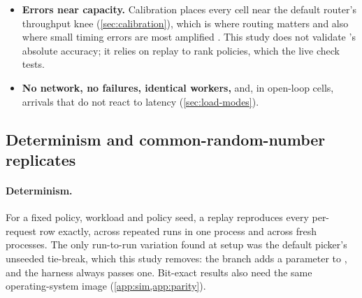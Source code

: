 \begin{itemize}
    prefill pass that mixes requests from the mean new and mean cached length of the batch, so
    adding a short prompt to a long-context chunk can shorten the predicted pass (from
    \SI{1744}{ms} to \SI{1150}{ms} in one probe). Its attention table for this configuration
    covers prompts up to 16,384 tokens with no cached prefix, so longer prefills are
    extrapolated. The likely effect is a small optimism when short prompts share a worker with
    long-context prefills; a search procedure could exploit it, which matters most for AgentX.
  \item \textbf{Errors near capacity.} Calibration places every cell near the default router's
    throughput knee (\cref{sec:calibration}), which is where routing matters and also where small
    timing errors are most amplified \citep{agrawal2024vidur}. This study does not validate
    \ais{}'s absolute accuracy; it relies on replay to rank policies, which the live check tests.
  \item \textbf{No network, no failures, identical workers,} and, in open-loop cells, arrivals
    that do not react to latency (\cref{sec:load-modes}).
\end{itemize}

\subsection{Determinism and common-random-number replicates}
\label{sec:replicates}

\paragraph{Determinism.}
For a fixed policy, workload and policy seed, a replay reproduces every per-request row exactly,
across repeated runs in one process and across fresh processes. The only run-to-run variation
found at setup was the default picker's unseeded tie-break, which this study removes: the branch
adds a  parameter to , and the harness always passes one. Bit-exact results
also need the same operating-system image (\cref{app:sim,app:parity}).

